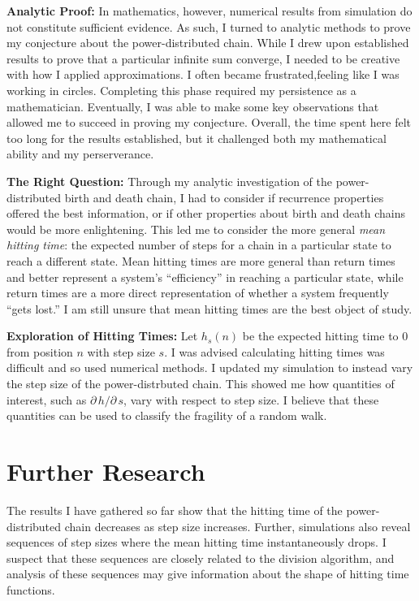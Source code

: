 \documentclass[12pt,letterpaper]{article}
\begin{document}
\noindent
\textbf{Analytic Proof:} In mathematics, however, numerical results from simulation do not constitute
sufficient evidence. As such, I turned to analytic methods to prove my conjecture about the
power-distributed chain. While I drew upon established results to prove that a particular infinite sum
converge, I needed to be creative with how I applied approximations. I often became frustrated,feeling
like I was working in circles. Completing this phase required my persistence as a mathematician.
Eventually, I was able to make some key observations that allowed me to succeed in proving my
conjecture.  Overall, the time spent here felt too long for the results established, but it challenged
both my mathematical ability and my perserverance.

\noindent \textbf{The Right Question:} Through my analytic investigation of the power-distributed birth
and death chain, I had to consider if recurrence properties offered the best information, or if other
properties about birth and death chains would be more enlightening. This led me to consider the more
general \emph{mean hitting time}: the expected number of steps for a chain in a particular state to
reach a different state. Mean hitting times are more general than return times and better represent
a system's ``efficiency'' in reaching a particular state, while return times are a more direct
representation of whether a system frequently ``gets lost.'' I am still unsure that mean hitting times
are the best object of study.

\noindent
\textbf{Exploration of Hitting Times:} Let $h_s(n)$ be the expected hitting time to $0$ from position
$n$ with step size $s$. I was advised calculating hitting times was difficult and so used numerical
methods. I updated my simulation to instead vary the step size of the power-distrbuted chain. This
showed me how quantities of interest, such as $\partial\, h/ \partial\, s$, vary with respect to step
size. I believe that these quantities can be used to classify the fragility of a random walk.


\section*{Further Research}
The results I have gathered so far show that the hitting time of the power-distributed chain decreases
as step size increases. Further, simulations also reveal sequences of step sizes where the mean hitting
time instantaneously drops. I suspect that these sequences are closely related to the division
algorithm, and analysis of these sequences may give information about the shape of hitting time
functions.
\end{document}
